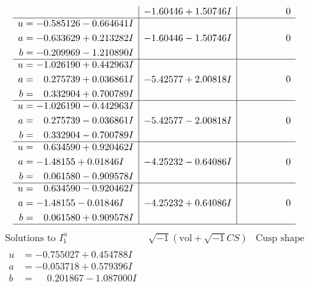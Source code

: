 \documentclass[1p]{elsarticle_modified}
\theoremstyle{definition}
\newcommand{\I}{\sqrt{-1}}
\begin{document}
$$\begin{array}{c|c|c}
 & -1.60446 + 1.50746 I & \phantom{-0.000000 } 0 \\ \hline\begin{aligned}
u &= -0.585126 - 0.664641 I \\
a &= -0.633629 + 0.213282 I \\
b &= -0.209969 - 1.210890 I\end{aligned}
 & -1.60446 - 1.50746 I & \phantom{-0.000000 } 0 \\ \hline\begin{aligned}
u &= -1.026190 + 0.442963 I \\
a &= \phantom{-}0.275739 + 0.036861 I \\
b &= \phantom{-}0.332904 + 0.700789 I\end{aligned}
 & -5.42577 + 2.00818 I & \phantom{-0.000000 } 0 \\ \hline\begin{aligned}
u &= -1.026190 - 0.442963 I \\
a &= \phantom{-}0.275739 - 0.036861 I \\
b &= \phantom{-}0.332904 - 0.700789 I\end{aligned}
 & -5.42577 - 2.00818 I & \phantom{-0.000000 } 0 \\ \hline\begin{aligned}
u &= \phantom{-}0.634590 + 0.920462 I \\
a &= -1.48155 + 0.01846 I \\
b &= \phantom{-}0.061580 - 0.909578 I\end{aligned}
 & -4.25232 - 0.64086 I & \phantom{-0.000000 } 0 \\ \hline\begin{aligned}
u &= \phantom{-}0.634590 - 0.920462 I \\
a &= -1.48155 - 0.01846 I \\
b &= \phantom{-}0.061580 + 0.909578 I\end{aligned}
 & -4.25232 + 0.64086 I & \phantom{-0.000000 } 0\\
 \hline 
 \end{array}$$\newpage$$\begin{array}{c|c|c}  
\text{Solutions to }I^u_{1}& \I (\text{vol} + \sqrt{-1}CS) & \text{Cusp shape}\\
 \hline 
\begin{aligned}
u &= -0.755027 + 0.454788 I \\
a &= -0.053718 + 0.579396 I \\
b &= \phantom{-}0.201867 - 1.087000 I\end{aligned}

\end{array}$$
\end{document}
